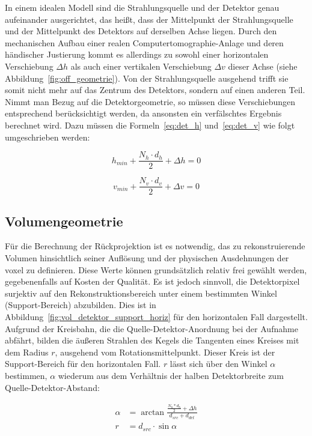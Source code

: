 In einem idealen Modell sind die Strahlungsquelle und der Detektor genau aufeinander ausgerichtet, das heißt, dass der
Mittelpunkt der Strahlungsquelle und der Mittelpunkt des Detektors auf derselben Achse liegen. Durch den mechanischen
Aufbau einer realen Computertomographie-Anlage und deren händischer Justierung kommt es allerdings zu sowohl
einer horizontalen Verschiebung $\Delta h$ als auch einer vertikalen Verschiebung $\Delta v$ dieser Achse (siehe
Abbildung~\ref{fig:off_geometrie}). Von der Strahlungsquelle ausgehend trifft sie somit nicht mehr auf das Zentrum des
Detektors, sondern auf einen anderen Teil. Nimmt man Bezug auf die Detektorgeometrie, so müssen diese Verschiebungen
entsprechend berücksichtigt werden, da ansonsten ein verfälschtes Ergebnis berechnet wird. Dazu müssen die
Formeln~\ref{eq:det_h} und~\ref{eq:det_v} wie folgt umgeschrieben werden:

\begin{equation} 
    h_{min} + \frac{N_h \cdot d_h}{2} + \Delta h = 0
\end{equation}

\begin{equation}
    v_{min} + \frac{N_v \cdot d_v}{2}  + \Delta v = 0
\end{equation}

\subsection{Volumengeometrie}\label{ssec:geometrie}

Für die Berechnung der Rückprojektion ist es notwendig, das zu rekonstruierende Volumen hinsichtlich seiner Auflösung
und der physischen Ausdehnungen der \gls{voxel} zu definieren. Diese Werte können grundsätzlich relativ frei gewählt
werden, gegebenenfalls auf Kosten der Qualität. Es ist jedoch sinnvoll, die Detektorpixel surjektiv auf den
Rekonstruktionsbereich unter einem bestimmten Winkel (Support-Bereich) abzubilden. Dies ist in
Abbildung~\ref{fig:vol_detektor_support_horiz} für den horizontalen Fall dargestellt. Aufgrund der Kreisbahn, die die
Quelle-Detektor-Anordnung bei der Aufnahme abfährt, bilden die äußeren Strahlen des Kegels die Tangenten eines Kreises
mit dem Radius $r$, ausgehend vom Rotationsmittelpunkt. Dieser Kreis ist der Support-Bereich für den horizontalen Fall.
$r$ lässt sich über den Winkel $\alpha$ bestimmen, $\alpha$ wiederum aus dem Verhältnis der halben Detektorbreite zum
Quelle-Detektor-Abstand:

\begin{equation}
    \begin{aligned}
        \alpha &= \arctan\frac{\frac{N_h * d_h}{2} + \Delta h}{d_{src} + d_{det}}\\
        r &= d_{src} \cdot \sin \alpha
    \end{aligned}
\end{equation}

